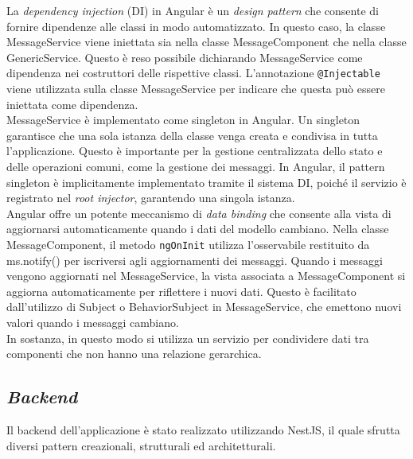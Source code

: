 La \textit{dependency injection} (DI) in Angular è un \textit{design pattern} che 
consente di fornire dipendenze alle classi in modo automatizzato. In questo 
caso, la classe MessageService viene iniettata sia nella classe 
MessageComponent che nella classe GenericService.
Questo è reso possibile dichiarando MessageService come dipendenza nei 
costruttori delle rispettive classi.
L'annotazione \texttt{@Injectable} viene utilizzata sulla classe MessageService 
per indicare che questa può essere iniettata come dipendenza.\\
MessageService è implementato come singleton in Angular. Un singleton garantisce 
che una sola istanza della classe venga creata e condivisa in tutta 
l'applicazione.
Questo è importante per la gestione centralizzata dello stato e delle operazioni 
comuni, come la gestione dei messaggi.
In Angular, il pattern singleton è implicitamente implementato tramite il 
sistema DI, poiché il servizio è registrato nel \textit{root injector}, 
garantendo una singola istanza.\\
Angular offre un potente meccanismo di \textit{data binding} che consente alla 
vista di aggiornarsi automaticamente quando i dati del modello cambiano.
Nella classe MessageComponent, il metodo \texttt{ngOnInit} utilizza 
l'osservabile restituito da ms.notify() per iscriversi agli aggiornamenti dei 
messaggi.
Quando i messaggi vengono aggiornati nel MessageService, la vista associata a 
MessageComponent si aggiorna automaticamente per riflettere i nuovi dati.
Questo è facilitato dall'utilizzo di Subject o BehaviorSubject in 
MessageService, che emettono nuovi valori quando i messaggi cambiano.\\
In sostanza, in questo modo si utilizza un servizio per condividere dati tra
componenti che non hanno una relazione gerarchica.



\subsection{\textit{Backend}}
Il backend dell'applicazione è stato realizzato utilizzando NestJS, il quale sfrutta diversi pattern creazionali, strutturali ed architetturali.

